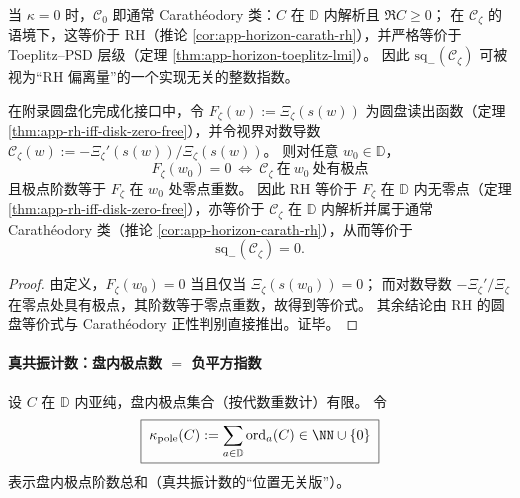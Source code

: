 \begin{remark}\label{rem:xi-negative-squares-vs-psd}
当 \(\kappa=0\) 时，\(\mathcal{C}_0\) 即通常 Carath\'eodory 类：\(C\) 在 \(\mathbb{D}\) 内解析且 \(\Re C\ge 0\)；
在 \(\mathscr{C}_{\zeta}\) 的语境下，这等价于 RH（推论 \ref{cor:app-horizon-carath-rh}），并严格等价于 Toeplitz--PSD 层级（定理 \ref{thm:app-horizon-toeplitz-lmi}）。
因此 \(\mathrm{sq}_-(\mathscr{C}_{\zeta})\) 可被视为“RH 偏离量”的一个实现无关的整数指数。
\end{remark}

\begin{theorem}\label{thm:xi-disk-zero-pole-index-reduction}
在附录圆盘化完成化接口中，令
\(
F_{\zeta}(w):=\Xi_{\zeta}(s(w))
\)
为圆盘读出函数（定理 \ref{thm:app-rh-iff-disk-zero-free}），并令视界对数导数
\(
\mathscr{C}_{\zeta}(w):=-\Xi_{\zeta}'(s(w))/\Xi_{\zeta}(s(w))
\)。
则对任意 \(w_0\in\mathbb{D}\)，
\[
\boxed{\;
F_{\zeta}(w_0)=0\ \Longleftrightarrow\ \mathscr{C}_{\zeta}\ \text{在}\ w_0\ \text{处有极点}\;}
\]
且极点阶数等于 \(F_{\zeta}\) 在 \(w_0\) 处零点重数。
因此 RH 等价于 \(F_{\zeta}\) 在 \(\mathbb{D}\) 内无零点（定理 \ref{thm:app-rh-iff-disk-zero-free}），亦等价于 \(\mathscr{C}_{\zeta}\) 在 \(\mathbb{D}\) 内解析并属于通常 Carath\'eodory 类（推论 \ref{cor:app-horizon-carath-rh}），从而等价于
\[
\boxed{\;\mathrm{sq}_-(\mathscr{C}_{\zeta})=0.\;}
\]
\end{theorem}

\begin{proof}
由定义，\(F_{\zeta}(w_0)=0\) 当且仅当 \(\Xi_{\zeta}(s(w_0))=0\)；
而对数导数 \(-\Xi_{\zeta}'/\Xi_{\zeta}\) 在零点处具有极点，其阶数等于零点重数，故得到等价式。
其余结论由 RH 的圆盘等价式与 Carath\'eodory 正性判别直接推出。证毕。
\end{proof}

\paragraph{真共振计数：盘内极点数 \texorpdfstring{$=$}{=} 负平方指数}
设 \(C\) 在 \(\mathbb{D}\) 内亚纯，盘内极点集合（按代数重数计）有限。
令
\begin{equation}\label{eq:xi-polecount-kappa}
\boxed{\;
\kappa_{\mathrm{pole}}(C):=\sum_{a\in\mathbb{D}}\operatorname{ord}_{a}(C)\in\NN\cup\{0\}\;}
\end{equation}
表示盘内极点阶数总和（真共振计数的“位置无关版”）。

